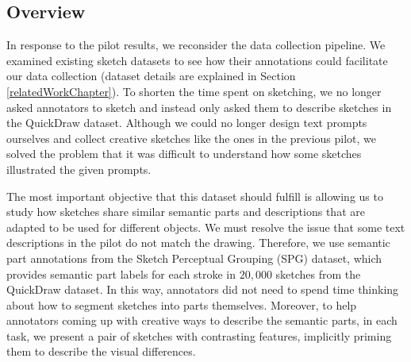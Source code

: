 
\subsection{Overview}
In response to the pilot results, we reconsider the data collection pipeline. 
We examined existing sketch datasets to see how their annotations could facilitate our data collection (dataset details are explained in Section \ref{relatedWorkChapter}).    
To shorten the time spent on sketching, we no longer asked annotators to sketch and instead only asked them to describe sketches in the QuickDraw dataset. 
Although we could no longer design text prompts ourselves and collect creative sketches like the ones in the previous pilot, we solved the problem that it was difficult to understand how some sketches illustrated the given prompts. 

The most important objective that this dataset should fulfill is allowing us to study how sketches share similar semantic parts and descriptions that are adapted to be used for different objects. We must resolve the issue that some text descriptions in the pilot do not match the drawing.  
Therefore, we use semantic part annotations from the Sketch Perceptual Grouping (SPG) dataset, which provides semantic part labels for each stroke in $20,000$ sketches from the QuickDraw dataset. In this way, annotators did not need to spend time thinking about how to segment sketches into parts themselves. 
Moreover, to help annotators coming up with creative ways to describe the semantic parts, in each task, we present a pair of sketches with contrasting features, implicitly priming them to describe the visual differences. 

